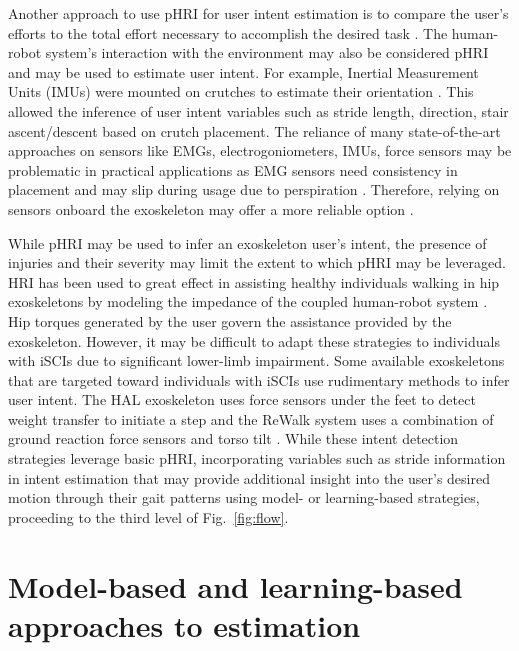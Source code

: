 Another approach to use pHRI for user intent estimation is to compare the user's efforts to the total effort necessary to accomplish the desired task \cite{pehlivan2015minimal}. The human-robot system's interaction with the environment may also be considered pHRI and may be used to estimate user intent. For example, Inertial Measurement Units (IMUs) were mounted on crutches to estimate their orientation \cite{brescianini2011ins}. This allowed the inference of user intent variables such as stride length, direction, stair ascent/descent based on crutch placement. The reliance of many state-of-the-art approaches on sensors like EMGs, electrogoniometers, IMUs, force sensors may be problematic in practical applications as EMG sensors need consistency in placement and may slip during usage due to perspiration \cite{tkach2010study,ison2014role}. Therefore, relying on sensors onboard the exoskeleton may offer a more reliable option \cite{Gambon20b}. 

While pHRI may be used to infer an exoskeleton user's intent, the presence of injuries and their severity may limit the extent to which pHRI may be leveraged. HRI has been used to great effect in assisting healthy individuals walking in hip exoskeletons by modeling the impedance of the coupled human-robot system \cite{zhang2019admittance,nagarajan2016integral}. Hip torques generated by the user govern the assistance provided by the exoskeleton. However, it may be difficult to adapt these strategies to individuals with iSCIs due to significant lower-limb impairment. Some available exoskeletons that are targeted toward individuals with iSCIs use rudimentary methods to infer user intent. The HAL exoskeleton uses force sensors under the feet to detect weight transfer to initiate a step \cite{suzuki2007intention} and the ReWalk system uses a combination of ground reaction force sensors and torso tilt \cite{goffer2012locomotion}. While these intent detection strategies leverage basic pHRI, incorporating variables such as stride information in intent estimation that may provide additional insight into the user's desired motion through their gait patterns using model- or learning-based strategies, proceeding to the third level of Fig.~\ref{fig:flow}.

\section{Model-based and learning-based approaches to estimation}

